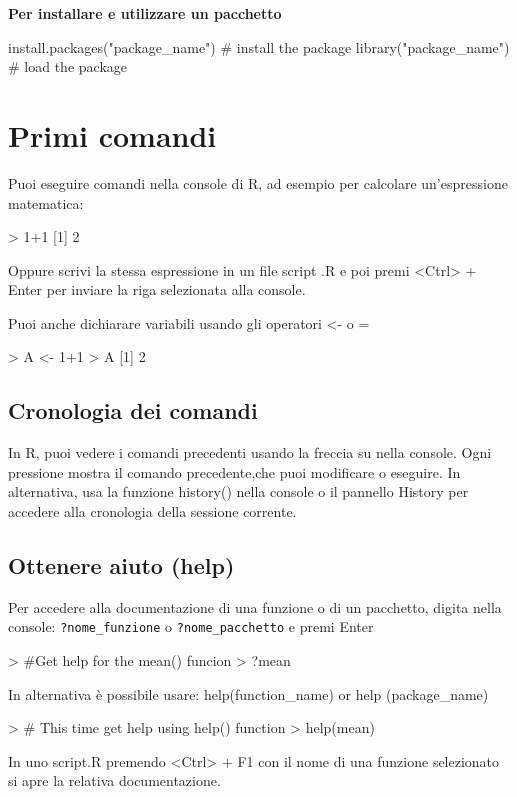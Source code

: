 \textbf{\textcolor{black!50!red}{Per installare e utilizzare un pacchetto}}
\begin{codiceR}
  install.packages("package_name") # install the package 
  library("package_name") # load the package
\end{codiceR}


\section{Primi comandi}
Puoi eseguire comandi nella console di R, ad esempio per calcolare 
un’espressione matematica:

\begin{codiceR}
  > 1+1
  [1] 2
\end{codiceR}
Oppure scrivi la stessa espressione in un file script .R e poi premi <Ctrl> + Enter per inviare la riga selezionata alla console.\par

Puoi anche dichiarare variabili usando gli operatori <- o =
\begin{codiceR}
  > A <- 1+1 
> A
  [1] 2
\end{codiceR}

\subsection{Cronologia dei comandi}

In R, puoi vedere i comandi precedenti usando la freccia su nella console. Ogni 
pressione mostra il comando precedente,che puoi modificare o eseguire.
In alternativa, usa la funzione history() nella console o il   pannello History per accedere alla cronologia della sessione corrente.

\subsection{Ottenere aiuto (help)}
Per accedere alla documentazione di una funzione o di un pacchetto, digita nella console:
\texttt{?nome\_funzione} o \texttt{?nome\_pacchetto} e premi Enter

\begin{codiceR}
> #Get help for the mean() funcion
> ?mean
\end{codiceR}


In alternativa è possibile usare: help(function\_name) or help (package\_name)
\begin{codiceR}
> # This time get help using help() function
> help(mean)
\end{codiceR}
In uno script.R premendo <Ctrl> + F1 con il nome di una funzione selezionato si apre la relativa documentazione.

